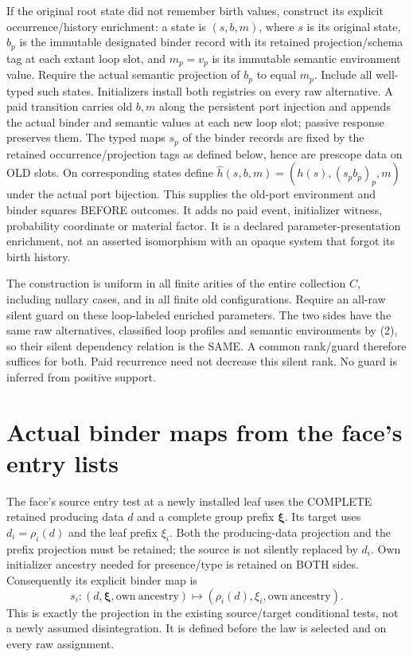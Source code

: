 \documentclass[11pt]{article}
\begin{document}
If the original root state did not remember birth values, construct its explicit occurrence/history enrichment: a state is $(s,b,m)$, where $s$ is its original state, $b_p$ is the immutable designated binder record with its retained projection/schema tag at each extant loop slot, and $m_p=v_p$ is its immutable semantic environment value. Require the actual semantic projection of $b_p$ to equal $m_p$. Include all well-typed such states. Initializers install both registries on every raw alternative. A paid transition carries old $b,m$ along the persistent port injection and appends the actual binder and semantic values at each new loop slot; passive response preserves them. The typed maps $s_p$ of the binder records are fixed by the retained occurrence/projection tags as defined below, hence are prescope data on OLD slots. On corresponding states define $\widehat h(s,b,m)=(h(s),(s_pb_p)_p,m)$ under the actual port bijection. This supplies the old-port environment and binder squares BEFORE outcomes. It adds no paid event, initializer witness, probability coordinate or material factor. It is a declared parameter-presentation enrichment, not an asserted isomorphism with an opaque system that forgot its birth history.

The construction is uniform in all finite arities of the entire collection $C$, including nullary cases, and in all finite old configurations. Require an all-raw silent guard on these loop-labeled enriched parameters. The two sides have the same raw alternatives, classified loop profiles and semantic environments by (2), so their silent dependency relation is the SAME. A common rank/guard therefore suffices for both. Paid recurrence need not decrease this silent rank. No guard is inferred from positive support.

\section{Actual binder maps from the face's entry lists}
The face's source entry test at a newly installed leaf uses the COMPLETE retained producing data $d$ and a complete group prefix $\boldsymbol\xi$. Its target uses $d_i=\rho_i(d)$ and the leaf prefix $\xi_i$. Both the producing-data projection and the prefix projection must be retained; the source is not silently replaced by $d_i$. Own initializer ancestry needed for presence/type is retained on BOTH sides. Consequently its explicit binder map is
\[
 s_i:(d,\boldsymbol\xi,\mathrm{own\ ancestry})
       \longmapsto(\rho_i(d),\xi_i,\mathrm{own\ ancestry}).     \tag{3}
\]
This is exactly the projection in the existing source/target conditional tests, not a newly assumed disintegration. It is defined before the law is selected and on every raw assignment.
\end{document}
